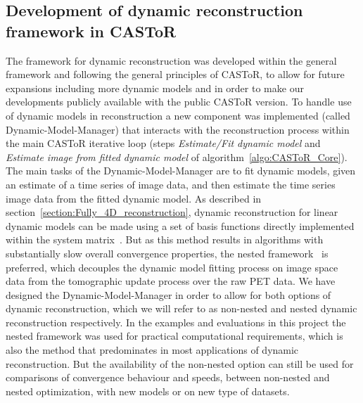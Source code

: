 \subsection{Development of dynamic reconstruction framework in CASToR}
The framework for dynamic reconstruction was developed within the general framework and following the general principles of CASToR, to allow for future expansions including more dynamic models and in order to make our developments publicly available with the public CASToR version. 
To handle use of dynamic models in reconstruction a new component was implemented (called Dynamic-Model-Manager) that interacts with the reconstruction process within the main CASToR iterative loop (steps \textit{Estimate/Fit dynamic model} and \textit{Estimate image from fitted dynamic model} of algorithm~\ref{algo:CASToR_Core}). 
The main tasks of the Dynamic-Model-Manager are to fit dynamic models, given an estimate of a time series of image data, and then estimate the time series image data from the fitted dynamic model. 
As described in section~\ref{section:Fully_4D_reconstruction}, dynamic reconstruction for linear dynamic models can be made using a set of basis functions directly implemented within the system matrix~\cite{Matthews1995,Wang2008,Reader2014}. But as this method results in algorithms with substantially slow overall convergence properties, the nested framework~\cite{Wang2010,Matthews2010} is preferred, which decouples the dynamic model fitting process on image space data from the tomographic update process over the raw PET data.
We have designed the Dynamic-Model-Manager in order to allow for both options of dynamic reconstruction, which we will refer to as non-nested and nested dynamic reconstruction respectively. 
In the examples and evaluations in this project the nested framework was used for practical computational requirements, which is also the method that predominates in most applications of dynamic reconstruction. But the availability of the non-nested option can still be used for comparisons of convergence behaviour and speeds, between non-nested and nested optimization, with new models or on new type of datasets. 

